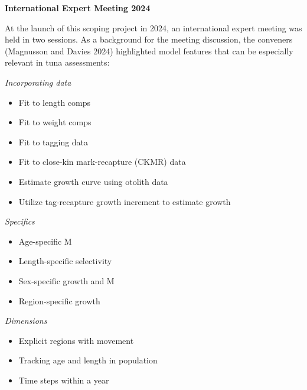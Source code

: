 \documentclass{SCreport}
\begin{document}
\vspace{2ex}

\textbf{International Expert Meeting 2024}

At the launch of this scoping project in 2024, an international expert meeting
was held in two sessions. As a background for the meeting discussion, the
conveners (Magnusson and Davies 2024) highlighted model features that can be
especially relevant in tuna assessments:

\vspace{1ex}

\textit{Incorporating data}

\begin{itemize}
  \item Fit to length comps\\[-4.5ex]
  \item Fit to weight comps\\[-4.5ex]
  \item Fit to tagging data\\[-4.5ex]
  \item Fit to close-kin mark-recapture (CKMR) data\\[-4.5ex]
  \item Estimate growth curve using otolith data\\[-4.5ex]
  \item Utilize tag-recapture growth increment to estimate growth
\end{itemize}

\textit{Specifics}

\begin{itemize}
  \item Age-specific M\\[-4.5ex]
  \item Length-specific selectivity\\[-4.5ex]
  \item Sex-specific growth and M\\[-4.5ex]
  \item Region-specific growth
\end{itemize}

\vspace{1ex}

\textit{Dimensions}

\begin{itemize}
  \item Explicit regions with movement\\[-4.5ex]
  \item Tracking age and length in population\\[-4.5ex]
  \item Time steps within a year
\end{itemize}
\end{document}
